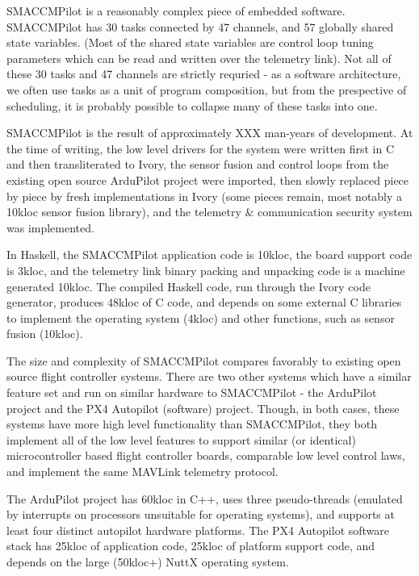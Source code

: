 SMACCMPilot is a reasonably complex piece of embedded software.  SMACCMPilot has
30 tasks connected by 47 channels, and 57 globally shared state variables. (Most
of the shared state variables are control loop tuning parameters which can be
read and written over the telemetry link). Not all of these 30 tasks and 47
channels are strictly requried - as a software architecture, we often use tasks
as a unit of program composition, but from the prespective of scheduling, it is
probably possible to collapse many of these tasks into one.

SMACCMPilot is the result of approximately XXX man-years of development. At the
time of writing, the low level drivers for the system were written first in C
and then transliterated to Ivory, the sensor fusion and control loops from the
existing open source ArduPilot project were imported, then slowly replaced piece
by piece by fresh implementations in Ivory (some pieces remain, most notably a
10kloc sensor fusion library), and the telemetry \& communication security
system was implemented.

In Haskell, the SMACCMPilot application code is 10kloc, the board support code
is 3kloc, and the telemetry link binary packing and unpacking code is a machine
generated 10kloc. The compiled Haskell code, run through the Ivory code
generator, produces 48kloc of C code, and depends on some external C libraries
to implement the operating system (4kloc) and other functions, such as sensor
fusion (10kloc).

The size and complexity of SMACCMPilot compares favorably to existing open
source flight controller systems. There are two other systems which have a
similar feature set and run on similar hardware to SMACCMPilot - the ArduPilot
project and the PX4 Autopilot (software) project. Though, in both cases, these
systems have more high level functionality than SMACCMPilot, they both implement
all of the low level features to support similar (or identical) microcontroller
based flight controller boards, comparable low level control laws, and implement
the same MAVLink telemetry protocol.

The ArduPilot project has 60kloc in C++, uses three pseudo-threads (emulated by
interrupts on processors unsuitable for operating systems), and supports at
least four distinct autopilot hardware platforms. The PX4 Autopilot software
stack has 25kloc of application code, 25kloc of platform support code, and
depends on the large (50kloc+) NuttX operating system.

